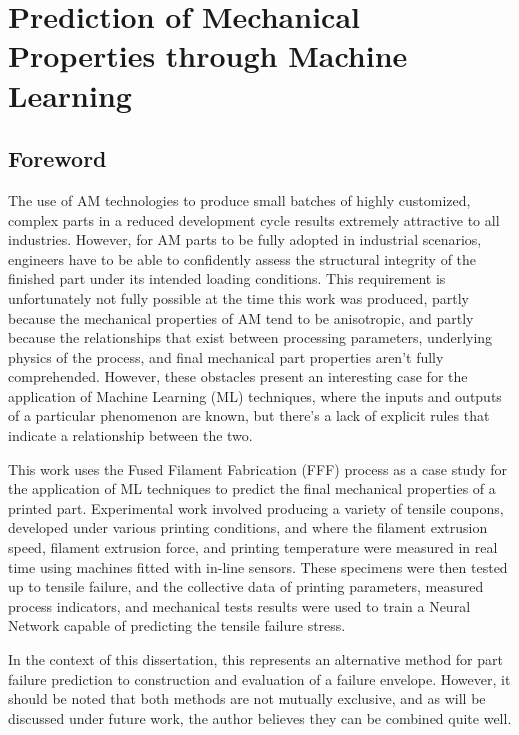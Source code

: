 \documentclass[main.tex]{subfiles}
\begin{document}
\chapter{Prediction of Mechanical Properties through Machine Learning} \label{ch:ml}

\section{Foreword} \label{sec:fw_ml}

The use of AM technologies to produce small batches of highly customized, complex parts in a reduced development cycle results extremely attractive to all industries. However, for AM parts to be fully adopted in industrial scenarios, engineers have to be able to confidently assess the structural integrity of the finished part under its intended loading conditions. This requirement is unfortunately not fully possible at the time this work was produced, partly because the mechanical properties of AM tend to be anisotropic, and partly because the relationships that exist between processing parameters, underlying physics of the process, and final mechanical part properties aren't fully comprehended. However, these obstacles present an interesting case for the application of Machine Learning (ML) techniques, where the inputs and outputs of a particular phenomenon are known, but there's a lack of explicit rules that indicate a relationship between the two. 

This work uses the Fused Filament Fabrication (FFF) process as a case study for the application of ML techniques to predict the final mechanical properties of a printed part. Experimental work involved producing a variety of tensile coupons, developed under various printing conditions, and where the filament extrusion speed, filament extrusion force, and printing temperature were measured in real time using machines fitted with in-line sensors. These specimens were then tested up to tensile failure, and the collective data of printing parameters, measured process indicators, and mechanical tests results were used to train a Neural Network capable of predicting the tensile failure stress.

In the context of this dissertation, this represents an alternative method for part failure prediction to construction and evaluation of a failure envelope. However, it should be noted that both methods are not mutually exclusive, and as will be discussed under future work, the author believes they can be combined quite well. 
\end{document}
